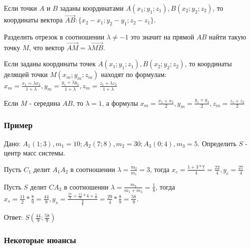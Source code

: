 \documentclass{article}
\begin{document}
\begin{flushleft}

Если точки $A$ и $B$ заданы координатами $A(x_1; y_1; z_1), B(x_2; y_2; z_2)$, то координаты вектора $\overrightarrow{AB}: \{x_2 - x_1; y_2 - y_1; z_2 - z_1\} $.

\hfill

Разделить отрезок в соотношении $\lambda \ne -1$ это значит на прямой $AB$ найти такую точку $M$, что вектор $\overrightarrow{AM} = \lambda \overrightarrow{MB}$.

\hfill 

Если заданы координаты точек $A(x_1;y_1;z_1), B(x_2;y_2;z_2)$, то координаты делящей точки $M(x_m;y_m;z_m)$ находят по формулам: $x_m = \frac{x_1 = \lambda x_2}{1 + \lambda}, y_m = \frac{y_1 + \lambda y_2}{1 + \lambda}, z_m = \frac{z_1 + \lambda z_2}{1 + \lambda}$

\hfill

Если $M$ - середина $AB$, то $\lambda = 1$, а формулы $x_m = \frac{x_1 + x_2}{2}, y_m = \frac{y_1 + y_2}{2}, z_m = \frac{z_1 + z_2}{2}$

\end{flushleft}

\subsubsection{Пример}

\begin{flushleft}

Дано: $A_1(1; 3), m_1 = 10; A_2(7; 8), m_2 = 30; A_3(0; 4), m_3 = 5$. Определить $S$ - центр масс системы.

Пусть $C_1$ делит $A_1A_2$ в соотношении $\lambda = \frac{m_2}{m_1} = 3$, тогда $x_c = \frac{1 + 3 * 7}{4} = \frac{22}{4}, y_c = \frac{27}{4}$

Пусть $S$ делит $CA_3$ в соотношении $\lambda = \frac{m_3}{m_1 + m_2} = \frac{1}{8}$, тогда $x_s = \frac{11}{2} * \frac{8}{9} = \frac{44}{9}, y_s = \frac{\frac{27}{4} + \frac{11}{8} * 4 + \frac{1}{8}}{\frac{9}{8}} = \frac{29}{4} * \frac{8}{9} = \frac{58}{9}$.

Ответ: $S(\frac{44}{9}; \frac{58}{9})$

\end{flushleft}

\subsubsection{Некоторые нюансы}
\end{document}
